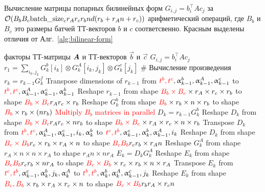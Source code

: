 \begin{algorithm}[tb]
   \caption{Вычисление матрицы попарных билинейных форм $G_{i,j} = b_i^\intercal A c_j$ за $\compl(B_b B_c \text{batch\_size}_c r_A r_c r_b n d (r_b + r_A n + r_c))$ арифметический операций, где $B_b$ и $B_c$ это размеры батчей ТТ-векторов $b$ и $c$ соответсвенно. Красным выделены отличия от Алг.~\ref{alg:bilinear-form}}
   \label{alg:pairwise-bilinear-form}
\begin{algorithmic}[1]
   \REQUIRE факторы ТТ-матрицы $\mat{A}$ и ТТ-векторов $\vec{b}$ и $\vec{c}$
   \ENSURE $G_{i,j} = b_i^\intercal A c_j$
   \STATE $r_1 = \sum_{i_k, j_k} G_k^b[i_k] \otimes G_k^A[i_k, j_k] \otimes G_k^c[j_k]$
   \STATE \# Вычисление произведения $r_k = r_{k-1}G_k^f$
   \STATE Transpose dimensions of $r_{k-1}$ from $\textcolor{red}{t^b, t^c}, \alpha_{k-1}^b,\alpha_{k-1}^A, \alpha_{k-1}^c$ to $\textcolor{red}{t^b, t^c}, \alpha_{k-1}^A, \alpha_{k-1}^c,\alpha_{k-1}^b$
   \STATE Reshape $r_{k-1}$ from shape $\textcolor{red}{B_b \times B_c} \times r_A \times r_c \times r_b$ to shape $\textcolor{red}{B_b \times B_c} r_A  r_c \times r_b$
   \STATE Reshape $G_k^b$ from shape $\textcolor{red}{B_b} \times r_b \times n \times r_b$ to shape $\textcolor{red}{B_b} \times r_b \times (n r_b)$
   \STATE \textcolor{red}{Multiply $B_b$ matrices in parallel} $D_k = r_{k-1} G_k^b$ 
   \STATE Reshape $D_k$ from shape $\textcolor{red}{B_b \times B_c} r_A r_c \times n r_b$ to shape $\textcolor{red}{B_b \times B_c} \times r_A \times r_c \times n \times r_b$
   \STATE Transpose $D_k$ from $\textcolor{red}{t^b, t^c}, \alpha_{k-1}^A, \alpha_{k-1}^c,i_k,\alpha_{k}^b$ to $\textcolor{red}{t^c, t^b},\alpha_{k-1}^c,\alpha_{k}^b,\alpha_{k-1}^A,i_k$
   \STATE Reshape $D_k$ from shape $\textcolor{red}{B_c \times B_b} r_c \times r_b \times r_A \times n$ to shape $\textcolor{red}{B_c B_b} r_c r_b \times r_A n$
   \STATE Reshape $G_k^A$ from shape $r_A \times n \times n \times r_A$ to shape $r_A n \times n r_A$
   \STATE $E_k = D_k G_k^A$ 
   \STATE Reshape $E_k$ from shape $\textcolor{red}{B_c B_b} r_c r_b \times n r_A$ to shape $\textcolor{red}{B_c \times B_b} \times r_c \times r_b \times n \times r_A$
   \STATE Transpose $E_k$ from $\textcolor{red}{t^c, t^b},\alpha_{k-1}^c, \alpha_{k}^b,j_k,\alpha_{k}^A$ to $\textcolor{red}{t^b, t^b},\alpha_{k}^b,\alpha_{k}^A,\alpha_{k-1}^c,j_k$
   \STATE Reshape $E_k$ from shape $\textcolor{red}{B_c, B_b} \times  r_b \times r_A \times r_c \times n$ to shape $\textcolor{red}{B_c \times B_b} r_b r_A \times r_c n$

\end{algorithmic}
\end{algorithm}
